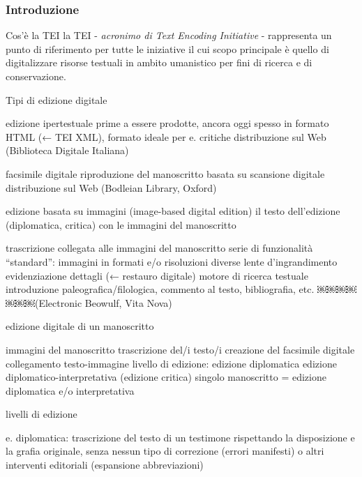 \begin{frame}
    \frametitle{Introduzione}
    \addtocounter{nframe}{1}
    

    \begin{block}{Cos'è la TEI}
        la TEI - \textit{acronimo di Text Encoding Initiative} - rappresenta un punto di riferimento per tutte le iniziative il cui scopo principale è quello di digitalizzare risorse testuali in ambito umanistico per fini di ricerca e di conservazione.
    \end{block}
    
\end{frame}

Tipi di edizione digitale

edizione ipertestuale
prime a essere prodotte, ancora oggi spesso in formato HTML (← TEI XML), formato ideale per e. critiche
distribuzione sul Web (Biblioteca Digitale Italiana) 

facsimile digitale
riproduzione del manoscritto basata su scansione digitale
distribuzione sul Web (Bodleian Library, Oxford)

edizione basata su immagini (image-based digital edition)
il testo dell’edizione (diplomatica, critica) con le immagini del
manoscritto

trascrizione collegata alle immagini del manoscritto serie di funzionalità “standard”:
immagini in formati e/o risoluzioni diverse 
lente d’ingrandimento
evidenziazione dettagli (← restauro digitale) 
motore di ricerca testuale
introduzione paleografica/filologica, 
commento al testo, bibliografia, etc.
￼￼￼￼￼￼￼(Electronic Beowulf, Vita Nova)

edizione digitale di un manoscritto

immagini del manoscritto trascrizione del/i testo/i creazione del facsimile digitale collegamento testo-immagine livello di edizione:
edizione diplomatica
edizione diplomatico-interpretativa (edizione critica)
singolo manoscritto = edizione diplomatica e/o interpretativa

livelli di edizione

e. diplomatica: trascrizione del testo di un testimone rispettando la disposizione e la grafia originale, senza nessun tipo di correzione (errori manifesti) o altri interventi editoriali (espansione abbreviazioni)

